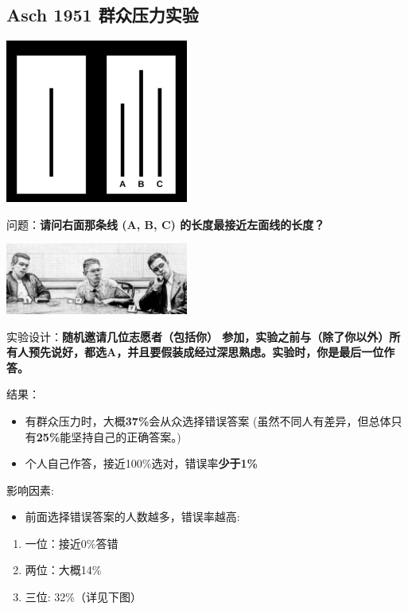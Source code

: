 \hypertarget{asch-1951-ux7fa4ux4f17ux538bux529bux5b9eux9a8c}{%
\subsection{Asch 1951
群众压力实验}\label{asch-1951-ux7fa4ux4f17ux538bux529bux5b9eux9a8c}}

\includegraphics[width=6cm]{Asch0Screenshot_2022-07-09_161023.jpg}

问题：\textbf{请问右面那条线 (A, B, C) 的长度最接近左面线的长度？}

\includegraphics[width=6cm]{Asch2Screenshot2.png}

实验设计：\textbf{随机邀请几位志愿者（包括你）
参加，实验之前与（除了你以外）所有人预先说好，都选A，并且要假装成经过深思熟虑。实验时，你是最后一位作答。}

结果：

\begin{itemize}
\tightlist
\item
  有群众压力时，大概\textbf{37\%}会从众选择错误答案
  (虽然不同人有差异，但总体只有\textbf{25\%}能坚持自己的正确答案。)
\item
  个人自己作答，接近100\%选对，错误率\textbf{少于1\%}
\end{itemize}

影响因素:

\begin{itemize}
\tightlist
\item
  前面选择错误答案的人数越多，错误率越高:
\end{itemize}

\begin{enumerate}
\tightlist
\item
  一位：接近0\%答错
\item
  两位：大概14\%
\item
  三位: 32\%（详见下图）
\end{enumerate}

